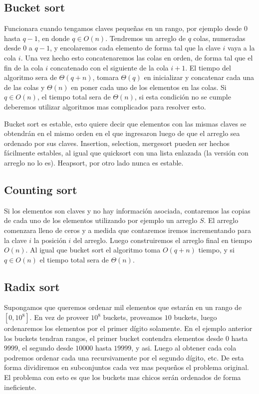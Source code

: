\documentclass[10pt, a4paper]{report}
\begin{document}
\subsection{Bucket sort} 

Funcionara cuando tengamos claves peque\~nas en un rango, por ejemplo desde $0$ hasta $q-1$, en donde $q \in O(n)$. Tendremos un arreglo de $q$ colas, numeradas desde $0$ a $q-1$, y encolaremos cada elemento de forma tal que la clave $i$ vaya a la cola $i$. Una vez hecho esto concatenaremos las colas en orden, de forma tal que el fin de la cola $i$ concatenado con el siguiente de la cola $i+1$. El tiempo del algoritmo sera de $\Theta(q+n)$, tomara $\Theta(q)$ en inicializar y concatenar cada una de las colas y $\Theta(n)$  en poner cada uno de los elementos en las colas. Si $q \in O(n)$, el tiempo total sera de $\Theta(n)$, si esta condici\'on no se cumple deberemos utilizar algoritmos mas complicados para resolver esto.


Bucket sort es estable, esto quiere decir que elementos con las mismas claves se obtendr\'an en el mismo orden en el que ingresaron luego de que el arreglo sea ordenado por sus claves. Insertion, selection, mergesort pueden ser hechos f\'acilmente estables, al igual que quicksort con una lista enlazada (la versi\'on con arreglo no lo es). Heapsort, por otro lado nunca es estable.

\subsection{Counting sort}

Si los elementos son claves y no hay informaci\'on asociada, contaremos las copias de cada uno de los elementos utilizando por ejemplo un arreglo $S$. El arreglo comenzara lleno de ceros y a medida que contaremos iremos incrementando para la clave $i$ la posici\'on $i$ del arreglo. Luego construiremos el arreglo final en tiempo $O(n)$. Al igual que bucket sort el algoritmo toma $O(q+n)$ tiempo, y si $q \in O(n)$ el tiempo total sera de $\Theta(n)$.

\subsection{Radix sort}

Supongamos que queremos ordenar mil elementos que estar\'an en un rango de $[0, 10^8]$. En vez de proveer $10^8$ buckets, proveamos $10$ buckets, luego ordenaremos los elementos por el primer d\'igito solamente. En el ejemplo anterior los buckets tendran rangos, el primer bucket  contendra elementos desde $0$ hasta $9999$, el segundo desde $10000$ hasta $19999$, y asi. Luego al obtener cada cola podremos ordenar cada una recursivamente por el segundo d\'igito, etc. De esta forma dividiremos en subconjuntos cada vez mas peque\~nos el problema original. El problema con esto es que los buckets mas chicos ser\'an ordenados de forma ineficiente.
\end{document}
